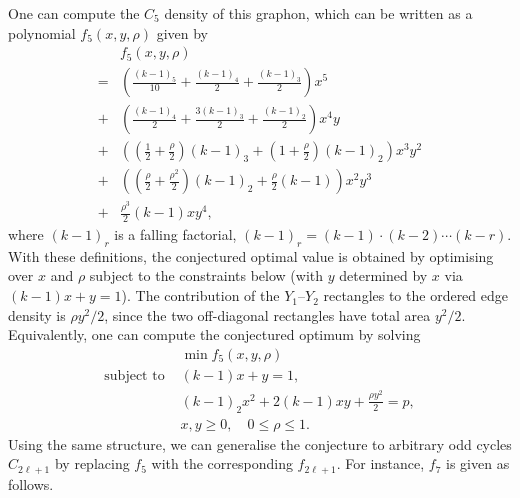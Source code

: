 \documentclass{article}
\theoremstyle{plain}
\theoremstyle{definition}
\theoremstyle{remark}
\begin{document}
One can compute the $C_5$ density of this graphon, which can be written as a polynomial $f_5(x, y, \rho)$ given by
\begin{align*}
    &f_5(x, y, \rho)
    \\
    {} = &\left(\frac{(k-1)_5}{10} + \frac{(k-1)_4}{2} + \frac{(k-1)_3}{2} \right)x^5
    \\
    {} + &\left( \frac{(k-1)_4}{2} + \frac{3(k-1)_3}{2} + \frac{(k-1)_2}{2}\right)x^4 y
    \\
    {} + &\left(\left(\frac{1}{2} + \frac{\rho}{2}\right) (k-1)_3 + \left(1 + \frac{\rho}{2}\right) (k-1)_2\right) x^3 y^2
    \\
    {} + &\left( \left(\frac{\rho}{2} + \frac{\rho^2}{2}\right) (k-1)_2 + \frac{\rho}{2}(k-1) \right) x^2 y^3
    \\
    {} + &\frac{\rho^3}{2} (k-1) xy^4,
\end{align*}
where $(k-1)_r$ is a falling factorial, $(k-1)_r = (k-1) \cdot (k-2) \cdots (k-r)$. 
With these definitions, the conjectured optimal value is obtained by optimising over $x$ and $\rho$ subject to the constraints below (with $y$ determined by $x$ via $(k-1)x + y = 1$).
The contribution of the $Y_1$--$Y_2$ rectangles to the ordered edge density is $\rho y^2/2$, since the two off-diagonal rectangles have total area $y^2/2$.
Equivalently, one can compute the conjectured optimum by solving
\begin{align*}
    &\min f_5(x, y, \rho)
    \\
  \text{subject to } & (k-1) x + y = 1, 
    \\
    & (k-1)_2 x^2 + 2 (k-1) xy + \frac{\rho y^2}{2} = p,
    \\
    & x, y \ge 0, \quad 0 \le \rho \le 1.
\end{align*}
Using the same structure, we can generalise the conjecture to arbitrary odd cycles $C_{2\ell+1}$ by replacing $f_5$ with the corresponding $f_{2\ell+1}$.
For instance, $f_7$ is given as follows.
\end{document}

